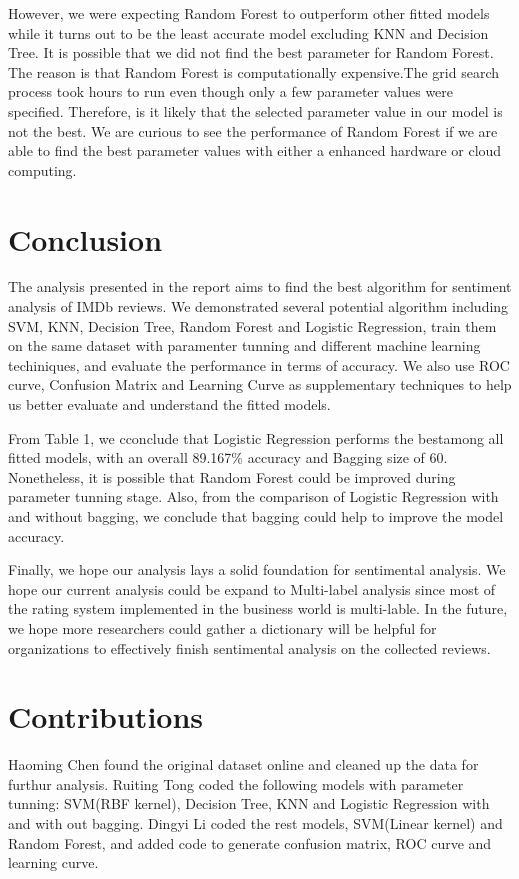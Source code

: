 \documentclass[10pt,twocolumn,letterpaper]{article}
\begin{document}
	However, we were expecting Random Forest to outperform other fitted models while it turns out to be the least accurate model excluding KNN and Decision Tree. It is possible that we did not find the best parameter for Random Forest. The reason is that Random Forest is computationally expensive.The grid search process took hours to run even though only a few parameter values were specified. Therefore, is it likely that the selected parameter value in our model is not the best. We are curious to see the performance of Random Forest if we are able to find the best parameter values with either a enhanced hardware or cloud computing.
	
	\section{Conclusion}
	The analysis presented in the report aims to find the best algorithm for sentiment analysis of IMDb reviews. We demonstrated several potential algorithm including SVM, KNN, Decision Tree, Random Forest and Logistic Regression, train them on the same dataset with paramenter tunning and different machine learning techiniques, and evaluate the performance in terms of accuracy. We also use ROC curve, Confusion Matrix and Learning Curve as supplementary techniques to help us better evaluate and understand the fitted models.
	
	From Table 1, we cconclude that Logistic Regression performs the bestamong all fitted models, with an overall 89.167\% accuracy and Bagging size of 60. Nonetheless, it is possible that Random Forest could be improved during parameter tunning stage. Also, from the comparison of Logistic Regression with and without bagging, we conclude that bagging could help to improve the model accuracy.
	
	Finally, we hope our analysis lays a solid foundation for sentimental analysis. We hope our current analysis could be expand to Multi-label analysis since most of the rating system implemented in the business world is multi-lable. In the future, we hope more researchers could gather a dictionary will be helpful for organizations to effectively finish sentimental analysis on the collected reviews.
	
	
	
	\section{Contributions}
	Haoming Chen found the original dataset online and cleaned up the data for furthur analysis. Ruiting Tong coded the following models with parameter tunning: SVM(RBF kernel), Decision Tree, KNN and Logistic Regression with and with out bagging. Dingyi Li coded the rest models, SVM(Linear kernel) and Random Forest, and added code to generate confusion matrix, ROC curve and learning curve.
	
\end{document}
